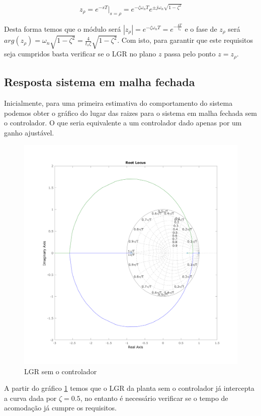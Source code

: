 \documentclass[a4paper,11pt]{article}
\begin{document}
\begin{equation}
    z_{\rho} = e^{-sT}|_{s=\rho} =  e^{-\zeta\omega_n T} e^{\pm j\omega_n\sqrt{1-\zeta^2}}
\end{equation}

Desta forma temos que o módulo será $|z_{\rho}| =  e^{-\zeta\omega_n T} = e^{-\frac{4T}{t_s}}$ e o fase de $z_\rho$ será $arg(z_{\rho}) = \omega_n\sqrt{1-\zeta^2} = \frac{4}{t_s\zeta}\sqrt{1-\zeta^2}$. Com isto, para garantir que este requisitos seja cumpridos basta verificar se o LGR no plano $z$ passa pelo ponto $z = z_{\rho}$.

\subsection{Resposta sistema em malha fechada}

Inicialmente, para uma primeira estimativa do comportamento do sistema podemos obter o gráfico do lugar das raizes para o sistema em malha fechada sem o controlador. O que seria equivalente a um controlador dado apenas por um ganho ajustável.

\begin{figure}[H]
    \centering
    \includegraphics[width=0.9\linewidth]{img/exsim3-rlocus-g2.png}
    \caption{LGR sem o controlador}
    \label{fig:ex3-rlocus-g2}
\end{figure}

A partir do gráfico \ref{fig:ex3-rlocus-g2} temos que o LGR da planta sem o controlador já intercepta a curva dada por $\zeta = 0.5$, no entanto é necessário verificar se o tempo de acomodação já cumpre os requisitos.
\end{document}

